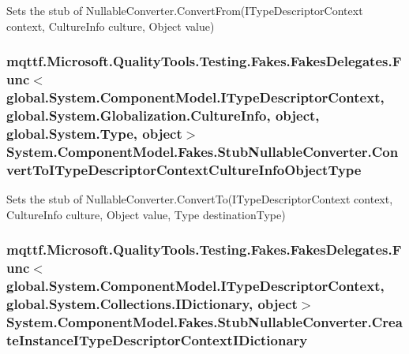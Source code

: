 Sets the stub of Nullable\-Converter.\-Convert\-From(\-I\-Type\-Descriptor\-Context context, Culture\-Info culture, Object value)

\hypertarget{class_system_1_1_component_model_1_1_fakes_1_1_stub_nullable_converter_ac95c313c37300825d98625af25726654}{
\subsubsection[{Convert\-To\-I\-Type\-Descriptor\-Context\-Culture\-Info\-Object\-Type}]{\setlength{\rightskip}{0pt plus 5cm}mqttf.\-Microsoft.\-Quality\-Tools.\-Testing.\-Fakes.\-Fakes\-Delegates.\-Func$<$global.\-System.\-Component\-Model.\-I\-Type\-Descriptor\-Context, global.\-System.\-Globalization.\-Culture\-Info, object, global.\-System.\-Type, object$>$ System.\-Component\-Model.\-Fakes.\-Stub\-Nullable\-Converter.\-Convert\-To\-I\-Type\-Descriptor\-Context\-Culture\-Info\-Object\-Type}}\label{class_system_1_1_component_model_1_1_fakes_1_1_stub_nullable_converter_ac95c313c37300825d98625af25726654}


Sets the stub of Nullable\-Converter.\-Convert\-To(\-I\-Type\-Descriptor\-Context context, Culture\-Info culture, Object value, Type destination\-Type)

\hypertarget{class_system_1_1_component_model_1_1_fakes_1_1_stub_nullable_converter_aa35e2678c4a9aff6962d8e69398b27f3}{
\subsubsection[{Create\-Instance\-I\-Type\-Descriptor\-Context\-I\-Dictionary}]{\setlength{\rightskip}{0pt plus 5cm}mqttf.\-Microsoft.\-Quality\-Tools.\-Testing.\-Fakes.\-Fakes\-Delegates.\-Func$<$global.\-System.\-Component\-Model.\-I\-Type\-Descriptor\-Context, global.\-System.\-Collections.\-I\-Dictionary, object$>$ System.\-Component\-Model.\-Fakes.\-Stub\-Nullable\-Converter.\-Create\-Instance\-I\-Type\-Descriptor\-Context\-I\-Dictionary}}\label{class_system_1_1_component_model_1_1_fakes_1_1_stub_nullable_converter_aa35e2678c4a9aff6962d8e69398b27f3}


